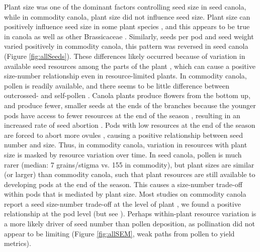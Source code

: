 \documentclass[12pt]{article} %
\begin{document}
Plant size was one of the dominant factors controlling seed size in seed canola, while in commodity canola, plant size did not influence seed size.
Plant size can positively influence seed size in some plant species \citep{maddox1983}, and this appears to be true in canola \citep{riffkin2012} as well as other Brassicaceae \citep{mazer1987}.
Similarly, seeds per pod and seed weight varied positively in commodity canola, this pattern was reversed in seed canola (Figure \ref{fig:allSeeds}). 
These differences likely occurred because of variation in available seed resources among the parts of the plant \citep{vanNoordwijk1986}, which can cause a positive size-number relationship even in resource-limited plants. 
In commodity canola, pollen is readily available, and there seems to be little difference between outcrossed- and self-pollen \citep{steffan2003, rosa2011}. 
Canola plants produce flowers from the bottom up, and produce fewer, smaller seeds at the ends of the branches because the younger pods have access to fewer resources at the end of the season \citep{sabbahi2006}, resulting in an increased rate of seed abortion \citep{clarke1979}.
Pods with low resources at the end of the season are forced to abort more ovules \citep{wang2011}, causing a positive relationship between seed number and size.
Thus, in commodity canola, variation in resources with plant size is masked by resource variation over time.  
In seed canola, pollen is much rarer (median: 7 grains/stigma vs. 155 in commodity), but plant sizes are similar (or larger) than commodity canola, such that plant resources are still available to developing pods at the end of the season.
This causes a size-number trade-off within pods that is mediated by plant size.
Most studies on commodity canola report a seed size-number trade-off at the level of plant \citep{angadi2003,koltowski2005}, we found a positive relationship at the pod level (but see \citealp{sabbahi2005}).
Perhaps within-plant resource variation is a more likely driver of seed number than pollen deposition, as pollination did not appear to be limiting (Figure \ref{fig:allSEM}, weak paths from pollen to yield metrics).
\end{document}
